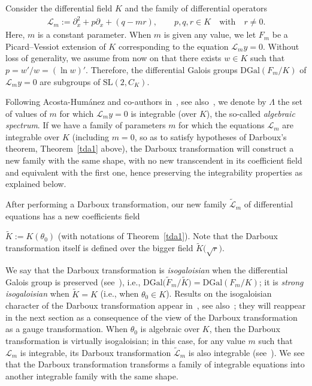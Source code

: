 \documentclass[pdftex]{sigma}%
\numberwithin{equation}{section}
\begin{document}
Consider the differential field $K$ and the family of differential operators
\begin{gather}\label{eqdarb}
 {\mathcal{L}}_m:=\partial_x^2 + p \partial_x +(q -mr), \qquad p,q,r\in K\quad \textrm{with}\quad
 r\neq 0.
\end{gather}
Here, $m$ is a constant parameter.
When $m$ is given any value, we let $F_m$ be a Picard--Vessiot extension of $K$ corresponding to the equation ${\mathcal{L}}_m y=0$.
Without loss of generality,
 we assume from now on that there exists $w\in K$ such that $p=w'/w = (\ln w)'$.
 Therefore, the differential Galois groups $\mathrm{DGal}(F_m/K)$ of ${\mathcal{L}}_my=0$ are subgroups of $\mathrm{SL}(2,C_K)$.

Following Acosta-Hum\'anez and co-authors in~\cite{AP1}, see also~\cite{AP2, ac2}, we denote by $\Lambda$ the set of values of $m$ for which ${\mathcal{L}}_m y=0$ is integrable (over $K$), the so-called \emph{algebraic spectrum}.
 If we have a family of parameters $m$
 for which the equations ${\mathcal{L}}_m$ are integrable over $K$
(including $m=0$, so as to satisfy hypotheses of Darboux's theorem, Theorem~\ref{tda1} above), the Darboux transformation will construct a new family with the same shape, with no new transcendent in its coefficient field and equivalent with the first one, hence
preserving the integrability properties as explained below.

After performing a Darboux transformation, our new family $\widetilde{\mathcal{L}}_m$ of differential equations has a new
coefficients field

$\widetilde{K}:= K(\theta_0)$ (with notations of Theorem~\ref{tda1}).
Note that the Darboux transformation itself is defined over the bigger field $\widetilde{K}\big(\sqrt{r}\big)$.

We say that
the Darboux transformation is
\emph{isogaloisian} when the differential Galois group is preserved (see~\cite{AP2,ac2,AP1}), i.e.,
	$\mathrm{DGal}\big(\widetilde{F}_m/{\widetilde K}\big) =\mathrm{DGal}(F_m/K)$;
 it is \emph{strong isogaloisian} when $\widetilde K=K$
 (i.e., when $\theta_0\in K$).
 Results on the isogaloisian character of the Darboux transformation appear in~\cite{AP1}, see also~\cite{AP2, ac2}; they will reappear in the next section as a consequence of the view of the Darboux transformation as a gauge transformation. When $\theta_0$ is algebraic over $K$, then the Darboux transformation is virtually isogaloisian; in this case, for any value $m$ such that ${\mathcal{L}}_m$ is integrable, its Darboux transformation $\widetilde{\mathcal{L}}_m$ is also integrable (see~\cite{AP1}).
We see that the Darboux transformation transforms a family of integrable equations into another integrable family with the same shape.
\end{document}

